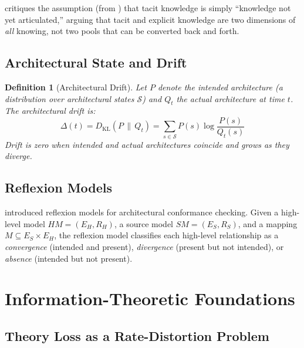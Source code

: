 \documentclass[11pt, a4paper, copyright]{googledeepmind}
\newtheorem{definition}{Definition}[section]
\begin{document}
\citet{tsoukas2003} critiques the assumption (from \citealt{nonaka1995}) that tacit knowledge is simply ``knowledge not yet articulated,'' arguing that tacit and explicit knowledge are two dimensions of \emph{all} knowing, not two pools that can be converted back and forth.

\subsection{Architectural State and Drift}

\begin{definition}[Architectural Drift]
\label{def:drift}
Let $P$ denote the intended architecture (a distribution over architectural states $\mathcal{S}$) and $Q_t$ the actual architecture at time $t$. The \emph{architectural drift} is:
\begin{equation}
    \Delta(t) = D_{\mathrm{KL}}(P \,\|\, Q_t) = \sum_{s \in \mathcal{S}} P(s) \log \frac{P(s)}{Q_t(s)}
\end{equation}
Drift is zero when intended and actual architectures coincide and grows as they diverge.
\end{definition}

\subsection{Reflexion Models}

\citet{murphy1995, murphy2001} introduced reflexion models for architectural conformance checking. Given a high-level model $HM = (E_H, R_H)$, a source model $SM = (E_S, R_S)$, and a mapping $M \subseteq E_S \times E_H$, the reflexion model classifies each high-level relationship as a \emph{convergence} (intended and present), \emph{divergence} (present but not intended), or \emph{absence} (intended but not present).


\section{Information-Theoretic Foundations}
\label{sec:info-theory}

\subsection{Theory Loss as a Rate-Distortion Problem}
\end{document}
